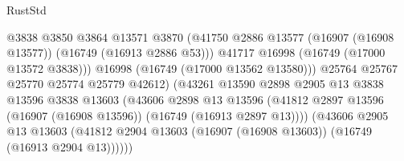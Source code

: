 \begin{lexlean}{RustStd}
\begin{coremodule}
                                              @3838
                                              @3850
                                              @3864
                                              @13571
                                              @3870
                                              (@41750
                                                @2886
                                                @13577
                                                (@16907 (@16908 @13577))
                                                (@16749 (@16913 @2886 @53)))
                                              @41717
                                              @16998
                                              (@16749 (@17000 @13572 @3838)))
                                            @16998
                                            (@16749 (@17000 @13562 @13580)))
                                          @25764
                                          @25767
                                          @25770
                                          @25774
                                          @25779
                                          @42612)
                                        (@43261
                                          @13590
                                          @2898
                                          @2905
                                          @13
                                          @3838
                                          @13596
                                          @3838
                                          @13603
                                          (@43606
                                            @2898
                                            @13
                                            @13596
                                            (@41812
                                              @2897
                                              @13596
                                              (@16907 (@16908 @13596))
                                              (@16749 (@16913 @2897 @13))))
                                          (@43606
                                            @2905
                                            @13
                                            @13603
                                            (@41812
                                              @2904
                                              @13603
                                              (@16907 (@16908 @13603))
                                              (@16749 (@16913 @2904 @13))))))

\end{coremodule}
\end{lexlean}
